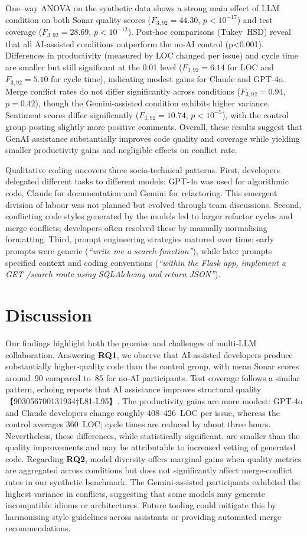 \documentclass[conference]{IEEEtran}
\begin{document}
One–way ANOVA on the synthetic data shows a strong main effect of LLM condition on both Sonar quality scores ($F_{3,92}=44.30$, $p<10^{-17}$) and test coverage ($F_{3,92}=28.69$, $p<10^{-12}$).  Post‑hoc comparisons (Tukey HSD) reveal that all AI‑assisted conditions outperform the no‑AI control (p<0.001).  Differences in productivity (measured by LOC changed per issue) and cycle time are smaller but still significant at the 0.01 level ($F_{3,92}=6.14$ for LOC and $F_{3,92}=5.10$ for cycle time), indicating modest gains for Claude and GPT‑4o.  Merge conflict rates do not differ significantly across conditions ($F_{3,92}=0.94$, $p=0.42$), though the Gemini‑assisted condition exhibits higher variance.  Sentiment scores differ significantly ($F_{3,92}=10.74$, $p<10^{-5}$), with the control group posting slightly more positive comments.  Overall, these results suggest that GenAI assistance substantially improves code quality and coverage while yielding smaller productivity gains and negligible effects on conflict rate.

Qualitative coding uncovers three socio‑technical patterns.  First, developers delegated different tasks to different models: GPT‑4o was used for algorithmic code, Claude for documentation and Gemini for refactoring.  This emergent division of labour was not planned but evolved through team discussions.  Second, conflicting code styles generated by the models led to larger refactor cycles and merge conflicts; developers often resolved these by manually normalising formatting.  Third, prompt engineering strategies matured over time: early prompts were generic (\emph{“write me a search function”}), while later prompts specified context and coding conventions (\emph{“within the Flask app, implement a GET /search route using SQLAlchemy and return JSON”}).

\section{Discussion}
Our findings highlight both the promise and challenges of multi‑LLM collaboration.  Answering \textbf{RQ1}, we observe that AI‑assisted developers produce substantially higher‑quality code than the control group, with mean Sonar scores around 90 compared to 85 for no‑AI participants.  Test coverage follows a similar pattern, echoing reports that AI assistance improves structural quality 【903056700131934†L81-L95】.  The productivity gains are more modest: GPT‑4o and Claude developers change roughly 408–426 LOC per issue, whereas the control averages 360 LOC; cycle times are reduced by about three hours.  Nevertheless, these differences, while statistically significant, are smaller than the quality improvements and may be attributable to increased vetting of generated code.  Regarding \textbf{RQ2}, model diversity offers marginal gains when quality metrics are aggregated across conditions but does not significantly affect merge‑conflict rates in our synthetic benchmark.  The Gemini‑assisted participants exhibited the highest variance in conflicts, suggesting that some models may generate incompatible idioms or architectures.  Future tooling could mitigate this by harmonising style guidelines across assistants or providing automated merge recommendations.
\end{document}
